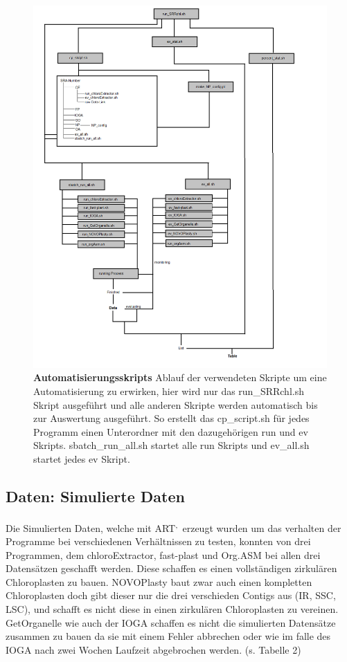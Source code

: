 \documentclass{scrartcl}
\begin{document}
\begin{figure}
\includegraphics[width=.9\linewidth]{./Diagram_Master.png}
\caption[Automatisierungsskripts]{\textbf{Automatisierungsskripts} Ablauf der verwendeten Skripte um eine Automatisierung zu erwirken, hier wird nur das run\_SRRchl.sh Skript ausgeführt und alle anderen Skripte werden automatisch bis zur Auswertung ausgeführt. So erstellt das cp\_script.sh für jedes Programm einen Unterordner mit den dazugehörigen run und ev Skripts. sbatch\_run\_all.sh startet alle run Skripts und ev\_all.sh startet jedes ev Skript.}
\end{figure}


\subsection{Daten: Simulierte Daten}
\label{sec-4-2}
Die Simulierten Daten, welche mit ART\footnotemark[51]{}\textsuperscript{,}\,\footnotemark[52]{} erzeugt wurden um das verhalten der Programme bei verschiedenen Verhältnissen zu testen, konnten von drei Programmen, dem chloroExtractor, fast-plast und Org.ASM 
bei allen drei Datensätzen geschafft werden. Diese schaffen es einen vollständigen zirkulären Chloroplasten zu bauen. NOVOPlasty baut zwar auch einen kompletten Chloroplasten doch gibt dieser 
nur die drei verschieden Contigs aus (IR, SSC, LSC), und schafft es nicht diese in einen zirkulären Chloroplasten zu vereinen. GetOrganelle wie auch der IOGA schaffen es nicht die
simulierten Datensätze zusammen zu bauen da sie mit einem Fehler abbrechen oder wie im falle des IOGA nach zwei Wochen Laufzeit abgebrochen werden. (s. Tabelle 2) 
\end{document}
